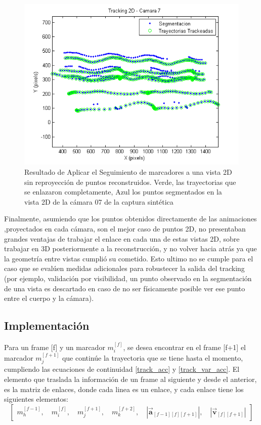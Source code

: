 \begin{figure}[hbt]
\begin{center}
\includegraphics[scale=0.7]{img/Tracking/011_tracking_2D_camara_07.png}
\end{center}
\caption{Resultado de Aplicar el Seguimiento de marcadores a una vista 2D sin reproyección de puntos reconstruidos. Verde, las trayectorias que se enlazaron completamente, Azul los puntos segmentados en la vista 2D de la cámara 07 de la captura sintética}
\label{tracking_2D_cam_07}
\end{figure}

Finalmente, asumiendo que los puntos obtenidos directamente de las animaciones ,proyectados en cada cámara, son el mejor caso de puntos 2D, no presentaban grandes ventajas de trabajar el enlace en cada una de estas vistas 2D, sobre trabajar en 3D posteriormente a la reconstrucción, y no volver hacia atrás ya que la geometría entre vistas cumplió su cometido. Esto ultimo no se cumple para el caso que se evalúen medidas adicionales para robustecer la salida del tracking (por ejemplo, validación por visibilidad, un punto observado en la segmentación de una vista es descartado en caso de no ser físicamente posible ver ese punto entre el cuerpo y la cámara).

\subsection{Implementación}

Para un frame [f] y un marcador $m_{i}^{[f]}$, se desea encontrar en el frame [f+1] el marcador $m_{j}^{[f+1]}$ que continúe la trayectoria que se tiene hasta el momento, cumpliendo las ecuaciones de continuidad \ref{track_acc} y \ref{track_var_acc}. El elemento que traslada la información de un frame al siguiente y desde el anterior, es la matriz de enlaces, donde cada linea es un enlace, y cada enlace tiene los siguientes elementos:
\begin{equation}
\begin{bmatrix}
  m_{h}^{[f-1]} ,\quad m_{i}^{[f]} ,\quad m_{j}^{[f+1]} ,\quad m_{k}^{[f+2]} ,\quad \left|\boldsymbol{\overrightarrow{a}}_{[f-1][f][f+1]}\right| ,\quad \left|\boldsymbol{\overrightarrow{v}}_{[f][f+1]}\right|
\end{bmatrix}
\end{equation}

